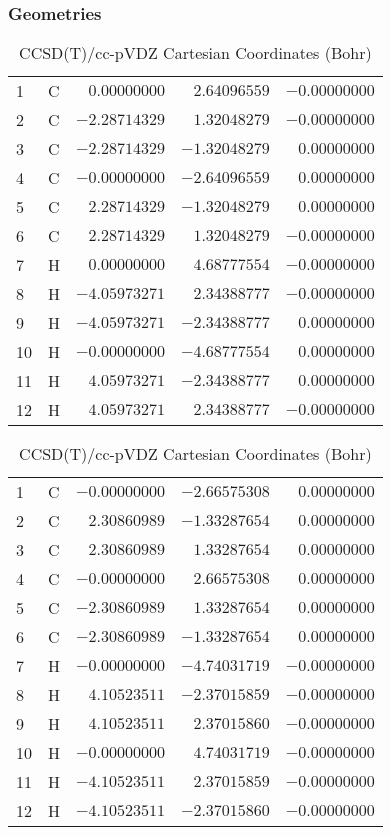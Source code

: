 \documentclass[10pt,oneside]{article}
\begin{document}
\begin{table}[h!]
\subsubsection*{Geometries}
\begin{multicols}{2}
\centering
\caption{CCSD(T)/cc-pVTZ Cartesian Coordinates (Bohr)}
\begin{tabular}{llrrr}
\toprule
1  & C  & $ 0.00000000$ & $ 2.64096559$ & $-0.00000000$ \\
2  & C  & $-2.28714329$ & $ 1.32048279$ & $-0.00000000$ \\
3  & C  & $-2.28714329$ & $-1.32048279$ & $ 0.00000000$ \\
4  & C  & $-0.00000000$ & $-2.64096559$ & $ 0.00000000$ \\
5  & C  & $ 2.28714329$ & $-1.32048279$ & $ 0.00000000$ \\
6  & C  & $ 2.28714329$ & $ 1.32048279$ & $-0.00000000$ \\
7  & H  & $ 0.00000000$ & $ 4.68777554$ & $-0.00000000$ \\
8  & H  & $-4.05973271$ & $ 2.34388777$ & $-0.00000000$ \\
9  & H  & $-4.05973271$ & $-2.34388777$ & $ 0.00000000$ \\
10 & H  & $-0.00000000$ & $-4.68777554$ & $ 0.00000000$ \\
11 & H  & $ 4.05973271$ & $-2.34388777$ & $ 0.00000000$ \\
12 & H  & $ 4.05973271$ & $ 2.34388777$ & $-0.00000000$ \\
\bottomrule
\end{tabular}
\caption{CCSD(T)/cc-pVDZ Cartesian Coordinates (Bohr)}
\begin{tabular}{llrrr}
\toprule
1  & C  & $-0.00000000$ & $-2.66575308$ & $ 0.00000000$ \\
2  & C  & $ 2.30860989$ & $-1.33287654$ & $ 0.00000000$ \\
3  & C  & $ 2.30860989$ & $ 1.33287654$ & $ 0.00000000$ \\
4  & C  & $-0.00000000$ & $ 2.66575308$ & $ 0.00000000$ \\
5  & C  & $-2.30860989$ & $ 1.33287654$ & $ 0.00000000$ \\
6  & C  & $-2.30860989$ & $-1.33287654$ & $ 0.00000000$ \\
7  & H  & $-0.00000000$ & $-4.74031719$ & $-0.00000000$ \\
8  & H  & $ 4.10523511$ & $-2.37015859$ & $-0.00000000$ \\
9  & H  & $ 4.10523511$ & $ 2.37015860$ & $-0.00000000$ \\
10 & H  & $-0.00000000$ & $ 4.74031719$ & $-0.00000000$ \\
11 & H  & $-4.10523511$ & $ 2.37015859$ & $-0.00000000$ \\
12 & H  & $-4.10523511$ & $-2.37015860$ & $-0.00000000$ \\
\bottomrule
\end{tabular}
\end{multicols}
\end{table}
\end{document}
